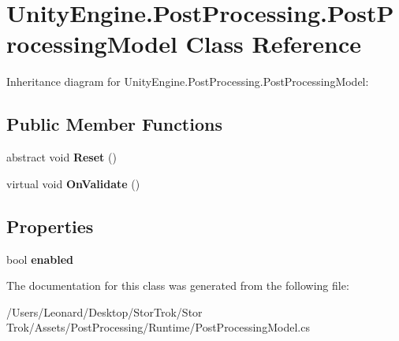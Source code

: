 \hypertarget{class_unity_engine_1_1_post_processing_1_1_post_processing_model}{}\section{Unity\+Engine.\+Post\+Processing.\+Post\+Processing\+Model Class Reference}
\label{class_unity_engine_1_1_post_processing_1_1_post_processing_model}


Inheritance diagram for Unity\+Engine.\+Post\+Processing.\+Post\+Processing\+Model\+:
\subsection*{Public Member Functions}
\begin{DoxyCompactItemize}
\item 
\mbox{\label{class_unity_engine_1_1_post_processing_1_1_post_processing_model_a15213e159193dba066f066b74b4e968d}} 
abstract void {\bfseries Reset} ()
\item 
\mbox{\label{class_unity_engine_1_1_post_processing_1_1_post_processing_model_acd362b51fa5958140754a1a4bdc1d768}} 
virtual void {\bfseries On\+Validate} ()
\end{DoxyCompactItemize}
\subsection*{Properties}
\begin{DoxyCompactItemize}
\item 
\mbox{\label{class_unity_engine_1_1_post_processing_1_1_post_processing_model_a94ada6da8010b232e32ff65d667db6a3}} 
bool {\bfseries enabled}
\end{DoxyCompactItemize}


The documentation for this class was generated from the following file\+:\begin{DoxyCompactItemize}
\item 
/\+Users/\+Leonard/\+Desktop/\+Stor\+Trok/\+Stor Trok/\+Assets/\+Post\+Processing/\+Runtime/Post\+Processing\+Model.\+cs\end{DoxyCompactItemize}
